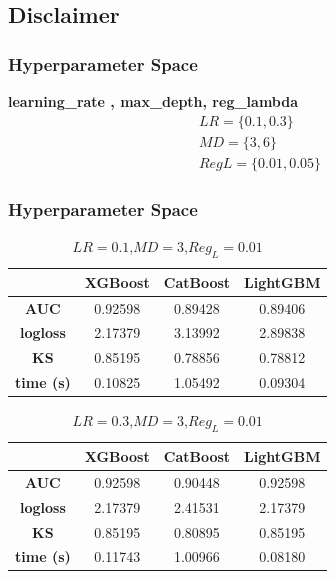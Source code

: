\documentclass{beamer}
\begin{document}
\subsection{Disclaimer}
\begin{frame}
\frametitle{Hyperparameter Space}
\textbf{learning\_rate , max\_depth, reg\_lambda}
\begin{gather*}
    LR = \{0.1,0.3\}\\
    MD = \{3,6\}\\
    RegL = \{0.01,0.05\}
\end{gather*}
\end{frame}
\begin{frame}
\frametitle{Hyperparameter Space}
\begin{table}[H]
\label{res:dia:2}
\centering
\begin{tabular}{|c|c|c|c|}
\hline
	& \textbf{XGBoost} &\textbf{CatBoost} & \textbf{LightGBM} \\
\hline
\textbf{AUC}	& 0.92598	& 0.89428	& 0.89406\\
\hline
\textbf{logloss}	& 2.17379	& 3.13992	& 2.89838\\
\hline
\textbf{KS}	& 0.85195	& 0.78856	& 0.78812 \\
\hline
\textbf{time (s)}	& 0.10825	& 1.05492	& 0.09304 \\
\hline
\end{tabular}
\caption{$LR=0.1$,$MD=3$,$Reg_L=0.01$ }
\end{table}
\begin{table}[H]
\label{res:dia:3}
\centering
\begin{tabular}{|c|c|c|c|}
\hline
	& \textbf{XGBoost} &\textbf{CatBoost} & \textbf{LightGBM} \\
\hline
\textbf{AUC}	& 0.92598	&0.90448	&0.92598\\
\hline
\textbf{logloss}	& 2.17379	&2.41531	&2.17379\\
\hline
\textbf{KS}	& 0.85195	& 0.80895 &	0.85195 \\
\hline
\textbf{time (s)}	& 0.11743&	1.00966&	0.08180 \\
\hline
\end{tabular}
\caption{$LR=0.3$,$MD=3$,$Reg_L=0.01$}
\end{table}
\end{frame}
\end{document}

